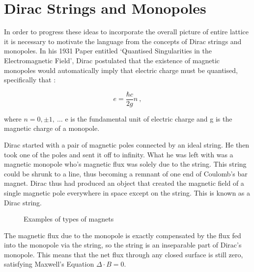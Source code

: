 \section{Dirac Strings and Monopoles}
In order to progress these ideas to incorporate the overall picture of entire lattice it is necessary to motivate the language from the concepts of Dirac strings and monopoles. In his 1931 Paper entitled `Quantised Singularities in the Electromagnetic Field', Dirac postulated that the existence of magnetic monopoles would automatically imply that electric charge must be quantised, specifically that :
\par
\begin{equation}
    e = \frac{\hbar c}{2g} n \ ,
\end{equation}
\par
where $n = 0, \pm 1, \ \hdots $ e is the fundamental unit of electric charge and g is the magnetic charge of a monopole. {\cite{b1}}
\par
Dirac started with a pair of magnetic poles connected by an ideal string.  He then took one of the poles and sent it off to infinity.  What he was left with was a magnetic monopole who's magnetic flux was solely due to the string. This string could be shrunk to a line, thus becoming a remnant of one end of Coulomb's bar magnet. Dirac thus had produced an object that created the magnetic field of a single magnetic pole everywhere in space except on the string. This is known as a Dirac string.
\par
\begin{figure}[ht!]
    \begin{center}
\qquad
\qquad
        \caption[Examples of types of magnets]{Examples of types of magnets}
        \label{fig:gf8}
    \end{center}
\end{figure}
The magnetic flux due to the monopole is exactly compensated by the flux fed into the monopole via the string, so the string is an inseparable part of Dirac's monopole. This means that the net flux through any closed surface is still zero, satisfying Maxwell's Equation $\Delta \cdot B = 0$.
